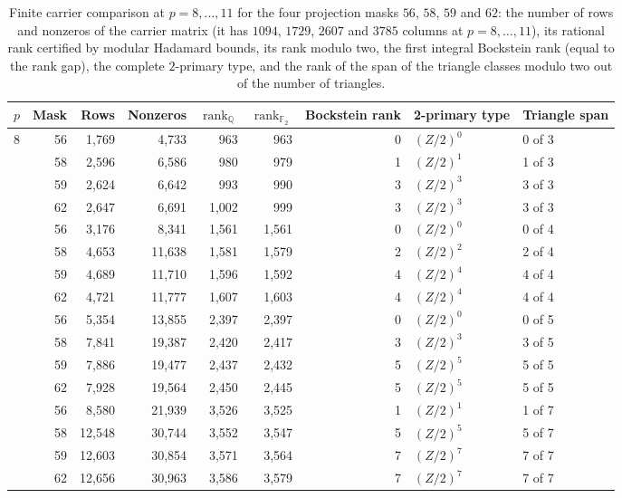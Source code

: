 \documentclass[11pt]{article}
\theoremstyle{definition}
\theoremstyle{remark}
\begin{document}
\begin{table}[t]
\centering\scriptsize
\begin{tabular}{rrrrrrrll}
\toprule
$p$ & Mask & Rows & Nonzeros & $\operatorname{rank}_{\mathbb Q}$ & $\operatorname{rank}_{\mathbb F_2}$ & Bockstein rank & 2-primary type & Triangle span\\
\midrule
8 & 56 & 1,769 & 4,733 & 963 & 963 & 0 & $(Z/2)^0$ & 0 of 3\\
 & 58 & 2,596 & 6,586 & 980 & 979 & 1 & $(Z/2)^1$ & 1 of 3\\
 & 59 & 2,624 & 6,642 & 993 & 990 & 3 & $(Z/2)^3$ & 3 of 3\\
 & 62 & 2,647 & 6,691 & 1,002 & 999 & 3 & $(Z/2)^3$ & 3 of 3\\
\addlinespace
9 & 56 & 3,176 & 8,341 & 1,561 & 1,561 & 0 & $(Z/2)^0$ & 0 of 4\\
 & 58 & 4,653 & 11,638 & 1,581 & 1,579 & 2 & $(Z/2)^2$ & 2 of 4\\
 & 59 & 4,689 & 11,710 & 1,596 & 1,592 & 4 & $(Z/2)^4$ & 4 of 4\\
 & 62 & 4,721 & 11,777 & 1,607 & 1,603 & 4 & $(Z/2)^4$ & 4 of 4\\
\addlinespace
10 & 56 & 5,354 & 13,855 & 2,397 & 2,397 & 0 & $(Z/2)^0$ & 0 of 5\\
 & 58 & 7,841 & 19,387 & 2,420 & 2,417 & 3 & $(Z/2)^3$ & 3 of 5\\
 & 59 & 7,886 & 19,477 & 2,437 & 2,432 & 5 & $(Z/2)^5$ & 5 of 5\\
 & 62 & 7,928 & 19,564 & 2,450 & 2,445 & 5 & $(Z/2)^5$ & 5 of 5\\
\addlinespace
11 & 56 & 8,580 & 21,939 & 3,526 & 3,525 & 1 & $(Z/2)^1$ & 1 of 7\\
 & 58 & 12,548 & 30,744 & 3,552 & 3,547 & 5 & $(Z/2)^5$ & 5 of 7\\
 & 59 & 12,603 & 30,854 & 3,571 & 3,564 & 7 & $(Z/2)^7$ & 7 of 7\\
 & 62 & 12,656 & 30,963 & 3,586 & 3,579 & 7 & $(Z/2)^7$ & 7 of 7\\
\bottomrule
\end{tabular}
\caption{Finite carrier comparison at $p=8,\ldots,11$ for the four projection masks $56$, $58$, $59$ and $62$: the number of rows and nonzeros
of the carrier matrix (it has $1094$, $1729$, $2607$ and $3785$ columns at $p=8,\ldots,11$), its rational rank certified by modular
Hadamard bounds, its rank modulo two, the first integral Bockstein rank (equal to the rank gap), the complete $2$-primary type, and the
rank of the span of the triangle classes modulo two out of the number of triangles.}
\label{tab:carrier}
\end{table}
\end{document}
